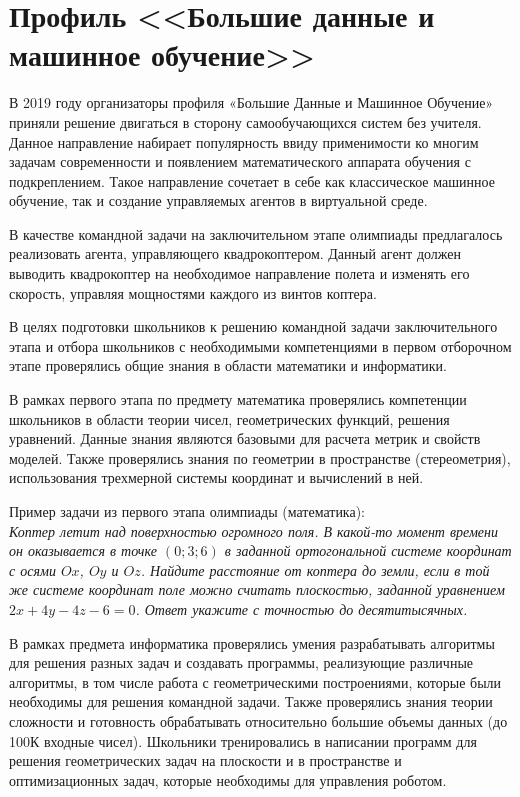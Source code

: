 

\section*{Профиль <<Большие данные и машинное обучение>>}

В 2019 году организаторы профиля «Большие Данные и Машинное Обучение»  приняли решение двигаться в сторону самообучающихся систем без учителя. Данное направление набирает популярность ввиду применимости ко многим задачам современности и появлением математического аппарата обучения с подкреплением. Такое направление сочетает в себе как классическое машинное обучение, так и создание управляемых агентов в виртуальной среде. 

В качестве командной задачи на заключительном этапе олимпиады предлагалось реализовать агента, управляющего квадрокоптером. Данный агент должен выводить квадрокоптер на необходимое направление полета и изменять его скорость, управляя мощностями каждого из винтов коптера.

В целях подготовки школьников к решению командной задачи заключительного этапа и отбора школьников с необходимыми компетенциями в первом отборочном этапе проверялись общие знания в области математики и информатики.

В рамках первого этапа по предмету математика проверялись компетенции школьников в области теории чисел, геометрических функций, решения уравнений. Данные знания являются базовыми для расчета метрик и свойств моделей. Также проверялись знания по геометрии в пространстве (стереометрия), использования трехмерной системы координат и вычислений в ней.  

Пример задачи из первого этапа олимпиады (математика):\\
\textit{Коптер летит над поверхностью огромного поля. В какой-то момент времени он оказывается в точке $(0; 3; 6)$ в заданной ортогональной системе координат с осями $Ox$, $Oy$ и $Oz$. Найдите расстояние от коптера до земли, если в той же системе координат поле можно считать плоскостью, заданной уравнением $2x+4y-4z-6 = 0$. Ответ укажите с точностью до десятитысячных.}

В рамках предмета информатика проверялись умения разрабатывать алгоритмы для решения разных задач и создавать программы, реализующие различные алгоритмы, в том числе работа с геометрическими построениями, которые были необходимы для решения командной задачи. Также проверялись знания теории сложности и готовность обрабатывать относительно большие объемы данных (до 100К входные чисел). Школьники тренировались в написании программ для решения геометрических задач на плоскости и в пространстве и оптимизационных задач, которые необходимы для управления роботом.

